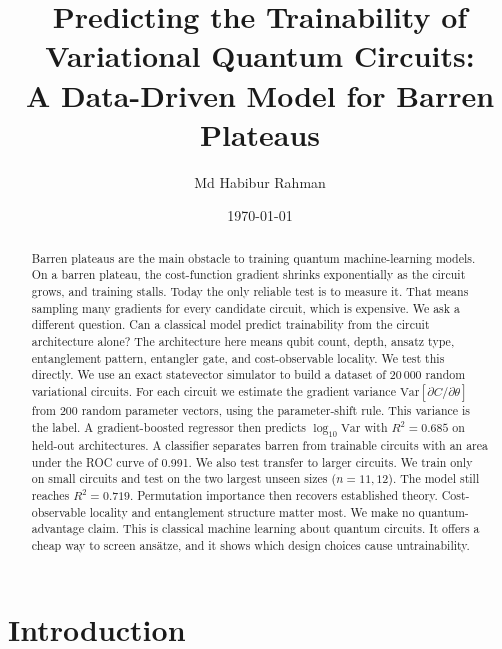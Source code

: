 \documentclass[aps,pra,preprint,amsmath,amssymb,floatfix,nofootinbib]{revtex4-2}
\newcommand{\Nrows}{20\,000}
\newcommand{\Samples}{200}
\newcommand{\RsqHold}{0.685}
\newcommand{\AucHold}{0.991}
\newcommand{\RsqExtrap}{0.719}
\begin{document}
\title{Predicting the Trainability of Variational Quantum Circuits:\\
A Data-Driven Model for Barren Plateaus}

\author{Md Habibur Rahman}

\date{\today}

\begin{abstract}
Barren plateaus are the main obstacle to training quantum machine-learning
models. On a barren plateau, the cost-function gradient shrinks exponentially as
the circuit grows, and training stalls. Today the only reliable test is to
measure it. That means sampling many gradients for every candidate circuit,
which is expensive. We ask a different question. Can a classical model predict
trainability from the circuit architecture alone? The architecture here means
qubit count, depth, ansatz type, entanglement pattern, entangler gate, and
cost-observable locality. We test this directly. We use an exact statevector
simulator to build a dataset of \Nrows{} random variational circuits. For each
circuit we estimate the gradient variance
$\mathrm{Var}[\partial C/\partial\theta]$ from \Samples{} random parameter
vectors, using the parameter-shift rule. This variance is the label. A
gradient-boosted regressor then predicts $\log_{10}\mathrm{Var}$ with
$R^2 = \RsqHold{}$ on held-out architectures. A classifier separates barren from
trainable circuits with an area under the ROC curve of \AucHold{}. We also test
transfer to larger circuits. We train only on small circuits and test on the two
largest unseen sizes ($n=11,12$). The model still reaches $R^2 = \RsqExtrap{}$.
Permutation importance then recovers established theory. Cost-observable
locality and entanglement structure matter most. We make no quantum-advantage
claim. This is classical machine learning about quantum circuits. It offers a
cheap way to screen ans\"atze, and it shows which design choices cause
untrainability.
\end{abstract}

\maketitle

\section{Introduction}
\end{document}
